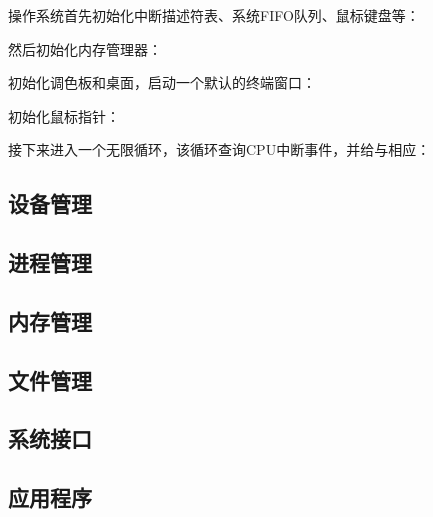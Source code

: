 
操作系统首先初始化中断描述符表、系统FIFO队列、鼠标键盘等：
{\linespread{1}}

然后初始化内存管理器：
{\linespread{1}}

初始化调色板和桌面，启动一个默认的终端窗口：
{\linespread{1}}

初始化鼠标指针：
{\linespread{1}}

接下来进入一个无限循环，该循环查询CPU中断事件，并给与相应：
{\linespread{1}}


\subsection{设备管理}
\label{sub:设备管理}

\subsection{进程管理}
\label{sub:进程管理}

\subsection{内存管理}
\label{sub:内存管理}

\subsection{文件管理}
\label{sub:文件管理}

\subsection{系统接口}
\label{sub:系统接口}

\subsection{应用程序}
\label{sub:应用程序}
